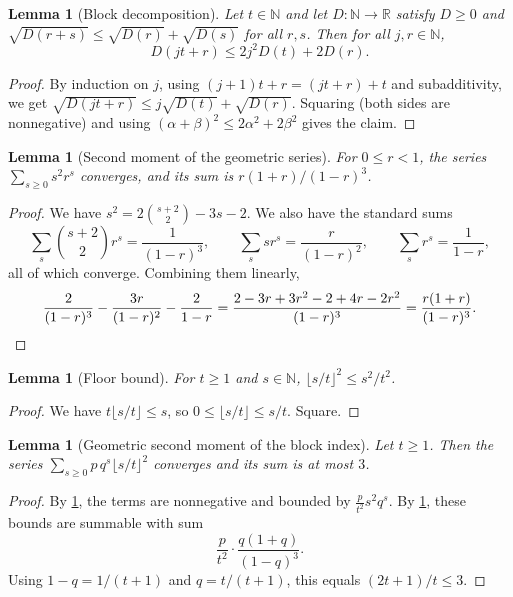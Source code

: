 \documentclass[11pt]{article}
\newtheorem{lemma}[theorem]{Lemma}
\theoremstyle{definition}
\theoremstyle{remark}
\newcommand{\R}{\mathbb{R}}
\newcommand{\N}{\mathbb{N}}
\begin{document}
\begin{lemma}[Block decomposition]\label{lem:mc_cesaro_blocks}
Let $t\in\N$ and let $D:\N\to\R$ satisfy $D\ge0$ and $\sqrt{D(r+s)}\le\sqrt{D(r)}+\sqrt{D(s)}$ for all $r,s$. Then for all $j,r\in\N$,
\[
D(jt+r)\le2j^2D(t)+2D(r).
\]
\end{lemma}
\begin{proof}
By induction on $j$, using $(j+1)t+r=(jt+r)+t$ and subadditivity, we get $\sqrt{D(jt+r)}\le j\sqrt{D(t)}+\sqrt{D(r)}$. Squaring (both sides are nonnegative) and using $(\alpha+\beta)^2\le2\alpha^2+2\beta^2$ gives the claim.
\end{proof}

\begin{lemma}[Second moment of the geometric series]\label{lem:mc_hasSum_sq_geom}
For $0\le r<1$, the series $\sum_{s\ge0}s^2r^s$ converges, and its sum is $r(1+r)/(1-r)^3$.
\end{lemma}
\begin{proof}
We have $s^2=2\binom{s+2}{2}-3s-2$. We also have the standard sums
\[
\sum_s\binom{s+2}2r^s=\frac1{(1-r)^3},\qquad\sum_ssr^s=\frac r{(1-r)^2},\qquad\sum_sr^s=\frac1{1-r},
\]
all of which converge. Combining them linearly,
\[
\frac{2}{(1-r)^3}-\frac{3r}{(1-r)^2}-\frac{2}{1-r}=\frac{2-3r+3r^2-2+4r-2r^2}{(1-r)^3}=\frac{r(1+r)}{(1-r)^3}. \qedhere
\]
\end{proof}

\begin{lemma}[Floor bound]\label{lem:mc_floor_div_sq_le}
For $t\ge1$ and $s\in\N$, $\lfloor s/t\rfloor^2\le s^2/t^2$.
\end{lemma}
\begin{proof}
We have $t\lfloor s/t\rfloor\le s$, so $0\le\lfloor s/t\rfloor\le s/t$. Square.
\end{proof}

\begin{lemma}[Geometric second moment of the block index]\label{lem:mc_geom_sq_div}
Let $t\ge1$. Then the series $\sum_{s\ge0}p\,q^s\lfloor s/t\rfloor^2$ converges and its sum is at most $3$.
\end{lemma}
\begin{proof}
By \cref{lem:mc_floor_div_sq_le}, the terms are nonnegative and bounded by $\frac{p}{t^2}s^2q^s$. By \cref{lem:mc_hasSum_sq_geom}, these bounds are summable with sum
\[
\frac p{t^2}\cdot\frac{q(1+q)}{(1-q)^3}.
\]
Using $1-q=1/(t+1)$ and $q=t/(t+1)$, this equals $(2t+1)/t\le3$.
\end{proof}
\end{document}
